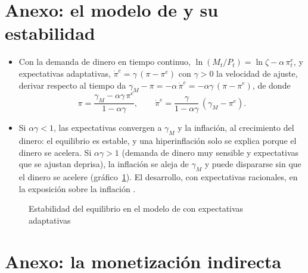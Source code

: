 \documentclass[11pt]{article}
\begin{document}
\section{Anexo: el modelo de  y su estabilidad}\label{anexo:cagan}

\begin{itemize}
\item Con la demanda de dinero en tiempo continuo, $\ln(M_t/P_t)=\ln\zeta-\alpha\,\pi^e_t$, y expectativas adaptativas, $\dot\pi^e=\gamma\,(\pi-\pi^e)$ con $\gamma>0$ la velocidad de ajuste, derivar respecto al tiempo da $\gamma_M-\pi=-\alpha\,\dot\pi^e=-\alpha\gamma\,(\pi-\pi^e)$, de donde
  \begin{equation*}
  \pi=\frac{\gamma_M-\alpha\gamma\,\pi^e}{1-\alpha\gamma},\qquad\dot\pi^e=\frac{\gamma}{1-\alpha\gamma}\,\left(\gamma_M-\pi^e\right) .
  \end{equation*}
\item Si $\alpha\gamma<1$, las expectativas convergen a $\gamma_M$ y la inflación, al crecimiento del dinero: el equilibrio es estable, y una hiperinflación solo se explica porque el dinero se acelera. Si $\alpha\gamma>1$ (demanda de dinero muy sensible y expectativas que se ajustan deprisa), la inflación se aleja de $\gamma_M$ y puede dispararse sin que el dinero se acelere (gráfico~\ref{fig:cagan-estabilidad}). El desarrollo, con expectativas racionales, en la exposición sobre la inflación .\findemo
\end{itemize}

\begin{figure}[H]
\centering
\caption{Estabilidad del equilibrio en el modelo de  con expectativas adaptativas}\label{fig:cagan-estabilidad}
\end{figure}

\section{Anexo: la monetización indirecta}\label{anexo:monetizacion-indirecta}
\end{document}
